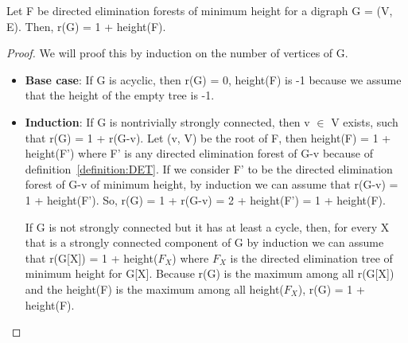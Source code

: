 \begin{lemma}
Let F be directed elimination forests of minimum height for a digraph G = (V, E). Then, r(G) = 1 + height(F). 
\end{lemma}
\begin{proof}
We will proof this by induction on the number of vertices of G.
\begin{itemize}
  \item \textbf{Base case}: If G is acyclic, then r(G) = 0, height(F) is -1 because we assume that the height of the empty tree is -1.
  \item \textbf{Induction}: If G is nontrivially strongly connected, then v $\in$ V exists, such that r(G) = 1 + r(G-v). Let (v, V) be the root of F, then height(F) = 1 + height(F') where F' is any directed elimination forest of G-v because of definition~\ref{definition:DET}. If we consider F' to be the directed elimination forest of G-v of minimum height, by induction we can assume that r(G-v) = 1 + height(F'). So, r(G) = 1 + r(G-v) = 2 + height(F') = 1 + height(F).
  
  If G is not strongly connected but it has at least a cycle, then, for every X that is a strongly connected component of G by induction we can assume that r(G[X]) = 1 + height($F_X$) where $F_X$ is the directed elimination tree of minimum height for G[X]. Because r(G) is the maximum among all r(G[X]) and the height(F) is the maximum among all height($F_X$), r(G) = 1 + height(F).
\end{itemize}
\end{proof}